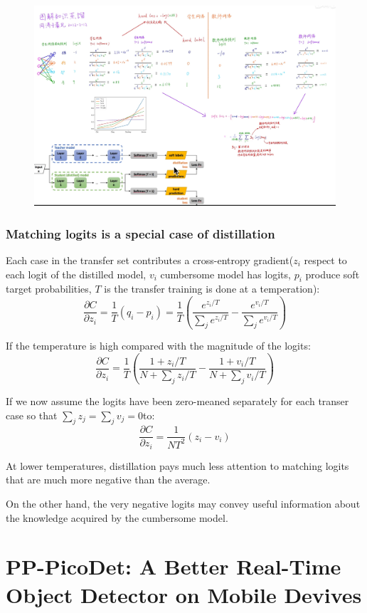 \documentclass[11pt]{article}
\begin{document}
\begin{figure}[H]
	\centering
	\includegraphics[scale = 0.35]{90}
\end{figure}
\subsubsection{Matching logits is a special case of distillation}
Each case in the transfer set contributes a cross-entropy gradient($z_i$ respect to each logit of the distilled model, $v_i$ cumbersome model has logits, $p_i$ produce soft target probabilities, $T$ is the transfer training is done at a temperation):
$$\frac{\partial C}{\partial z_i} = \frac{1}{T}(q_i-p_i) = \frac{1}{T}(\frac{e^{z_i/T}}{\sum_{j}e^{z_i/T}}-\frac{e^{v_i/T}}{\sum_{j}e^{v_i/T}})$$

If the temperature is high compared with the magnitude of the logits:
$$\frac{\partial C }{\partial z_i} = \frac{1}{T}(\frac{1 + z_i/T}{N + \sum_{j}z_i/T}-\frac{1 + v_i/T}{N + \sum_{j}v_i/T})$$

If we now assume the logits have been zero-meaned separately for each transer case so that $\sum_{j}z_j = \sum_{j}v_j = 0$to:
$$\frac{\partial C }{\partial z_i} = \frac{1}{NT^2}(z_i-v_i)$$

At lower temperatures, distillation pays much less attention to matching logits that are much more negative than the average.

On the other hand, the very negative logits may convey useful information about the knowledge acquired by the cumbersome model.
\section{PP-PicoDet: A Better Real-Time Object Detector on Mobile Devives}
\end{document}
